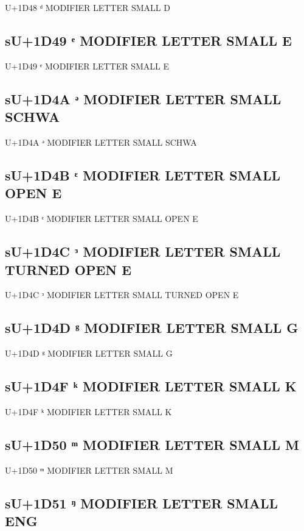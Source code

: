 U+1D48 ᵈ MODIFIER LETTER SMALL D

\subsection{sU+1D49 ᵉ MODIFIER LETTER SMALL E}

U+1D49 ᵉ MODIFIER LETTER SMALL E

\subsection{sU+1D4A ᵊ MODIFIER LETTER SMALL SCHWA}

U+1D4A ᵊ MODIFIER LETTER SMALL SCHWA

\subsection{sU+1D4B ᵋ MODIFIER LETTER SMALL OPEN E}

U+1D4B ᵋ MODIFIER LETTER SMALL OPEN E

\subsection{sU+1D4C ᵌ MODIFIER LETTER SMALL TURNED OPEN E}

U+1D4C ᵌ MODIFIER LETTER SMALL TURNED OPEN E

\subsection{sU+1D4D ᵍ MODIFIER LETTER SMALL G}

U+1D4D ᵍ MODIFIER LETTER SMALL G

\subsection{sU+1D4F ᵏ MODIFIER LETTER SMALL K}

U+1D4F ᵏ MODIFIER LETTER SMALL K

\subsection{sU+1D50 ᵐ MODIFIER LETTER SMALL M}

U+1D50 ᵐ MODIFIER LETTER SMALL M

\subsection{sU+1D51 ᵑ MODIFIER LETTER SMALL ENG}

